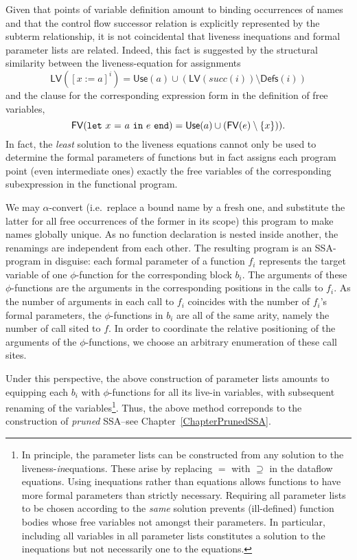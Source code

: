 Given that points of variable definition amount to binding occurrences
of names and that the control flow successor relation is explicitly
represented by the subterm relationship, it is not coincidental that
liveness inequations and formal parameter lists are related. Indeed,
this fact is suggested by the structural similarity between the
liveness-equation for assignments $$\mathsf{LV}([x:=a]^i) =
\mathsf{Use}(a) \cup (\mathsf{LV}(\mathit{succ}(i)) \setminus \mathsf{Defs}(i))$$ and the clause for the corresponding expression form %
in the definition of free variables,
$$\mathsf{FV}(\mathtt{let}\ {x}\ \mathtt{=}\ {a}\ \mathtt{in}\ {e}\ \mathtt{end}) = \mathsf{Use}(a) \cup (\mathsf{FV}(e) \setminus
\{x\})).$$ In fact, the
\emph{least} solution to the liveness equations cannot only be used to determine the formal parameters of functions but in fact assigns each program point (even
intermediate ones) exactly the free variables of the corresponding
subexpression in the functional program.

We may $\alpha$-convert (i.e.~replace a bound name by a fresh one, and
substitute the latter for all free occurrences of the former in its
scope) this program to make names globally unique. As no function
declaration is nested inside another, the renamings are independent
from each other.  The resulting program is an SSA-program in disguise:
each formal parameter of a function $f_i$ represents the target
variable of one $\phi$-function for the corresponding block $b_i$. The
arguments of these $\phi$-functions are the arguments in the
corresponding positions in the calls to $f_i$. As the number of
arguments in each call to $f_i$ coincides with the number of $f_i$'s
formal parameters, the $\phi$-functions in $b_i$ are all of the same
arity, namely the number of call sited to $f$. In order to coordinate
the relative positioning of the arguments of the $\phi$-functions, we
choose an arbitrary enumeration of these call sites. 

Under this perspective, the above construction of parameter lists
amounts to equipping each $b_i$ with $\phi$-functions for all its
live-in variables, with subsequent renaming of the
variables\footnote{In principle, the parameter lists can be
constructed from any solution to the
liveness-\emph{in}equations. These arise by replacing $=$ with
$\supseteq$ in the dataflow equations. Using inequations rather than
equations allows functions to have more formal parameters than
strictly necessary. Requiring all parameter lists to be chosen
according to the
\emph{same} solution prevents (ill-defined) function bodies whose free
variables not amongst their parameters.  In particular, including all
variables in all parameter lists constitutes a solution to the
inequations but not necessarily one to the equations.}. Thus, the
above method correponds to the construction of \emph{pruned} SSA--see
Chapter~\ref{ChapterPrunedSSA}.

